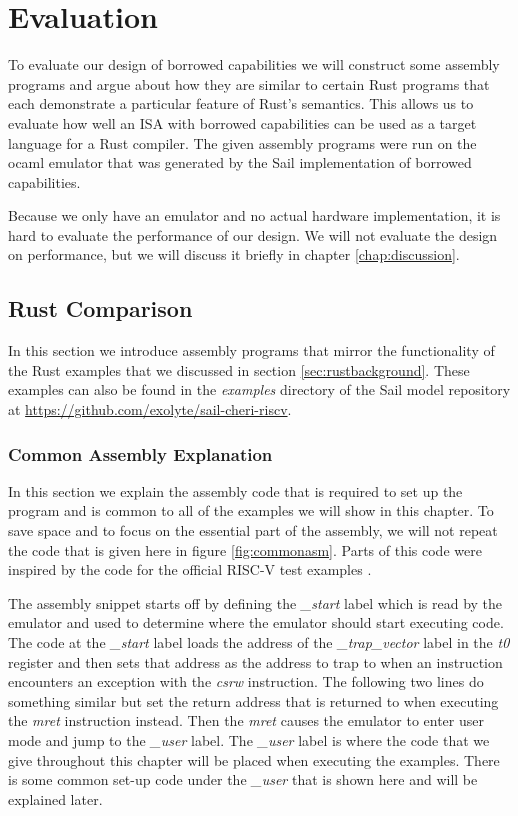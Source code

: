\chapter{Evaluation}
\label{chap:evaluation}
To evaluate our design of borrowed capabilities we will construct some assembly programs and argue about how they are similar to certain Rust programs that each demonstrate a particular feature of Rust's semantics.
This allows us to evaluate how well an ISA with borrowed capabilities can be used as a target language for a Rust compiler.
The given assembly programs were run on the ocaml emulator that was generated by the Sail implementation of borrowed capabilities.



Because we only have an emulator and no actual hardware implementation, it is hard to evaluate the performance of our design.
We will not evaluate the design on performance, but we will discuss it briefly in chapter \ref{chap:discussion}.

\section{Rust Comparison}
\label{sec:rustexampleseval}
In this section we introduce assembly programs that mirror the functionality of the Rust examples that we discussed in section \ref{sec:rustbackground}.
These examples can also be found in the \textit{examples} directory of the Sail model repository at \url{https://github.com/exolyte/sail-cheri-riscv}.

\subsection{Common Assembly Explanation}
In this section we explain the assembly code that is required to set up the program and is common to all of the examples we will show in this chapter.
To save space and to focus on the essential part of the assembly, we will not repeat the code that is given here in figure \ref{fig:commonasm}.
Parts of this code were inspired by the code for the official RISC-V test examples \cite{riscvtest}.

The assembly snippet starts off by defining the \textit{\_start} label which is read by the emulator and used to determine where the emulator should start executing code.
The code at the \textit{\_start} label loads the address of the \textit{\_trap\_vector} label in the \textit{t0} register and then sets that address as the address to trap to when an instruction encounters an exception with the \textit{csrw} instruction.
The following two lines do something similar but set the return address that is returned to when executing the \textit{mret} instruction instead.
Then the \textit{mret} causes the emulator to enter user mode and jump to the \textit{\_user} label.
The \textit{\_user} label is where the code that we give throughout this chapter will be placed when executing the examples.
There is some common set-up code under the \textit{\_user} that is shown here and will be explained later.

